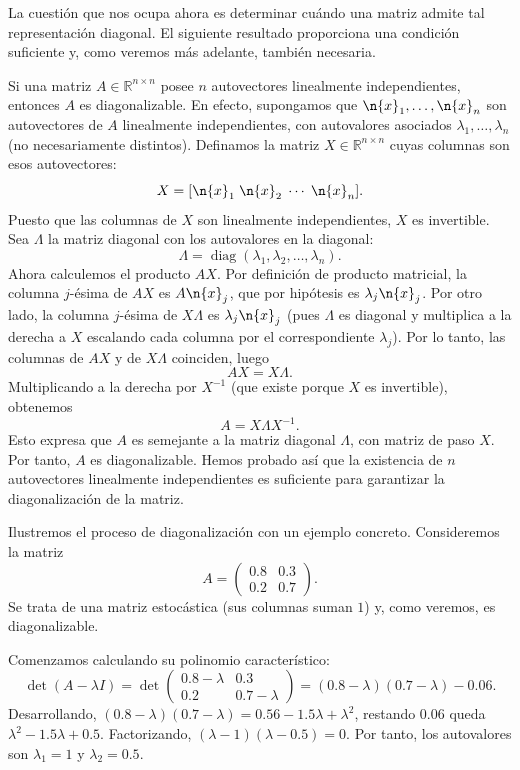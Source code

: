 La cuestión que nos ocupa ahora es determinar cuándo una matriz admite tal representación diagonal. El siguiente resultado proporciona una condición suficiente y, como veremos más adelante, también necesaria.

Si una matriz $A \in \mathbb{R}^{n\times n}$ posee $n$ autovectores linealmente independientes, entonces $A$ es diagonalizable. En efecto, supongamos que $\n{x}_1, \dots, \n{x}_n$ son autovectores de $A$ linealmente independientes, con autovalores asociados $\lambda_1, \dots, \lambda_n$ (no necesariamente distintos). Definamos la matriz $X \in \mathbb{R}^{n\times n}$ cuyas columnas son esos autovectores:
\[
X = [\n{x}_1 \; \n{x}_2 \; \cdots \; \n{x}_n].
\]
Puesto que las columnas de $X$ son linealmente independientes, $X$ es invertible. Sea $\Lambda$ la matriz diagonal con los autovalores en la diagonal:
\[
\Lambda = \operatorname{diag}(\lambda_1, \lambda_2, \dots, \lambda_n).
\]
Ahora calculemos el producto $A X$. Por definición de producto matricial, la columna $j$-ésima de $A X$ es $A \n{x}_j$, que por hipótesis es $\lambda_j \n{x}_j$. Por otro lado, la columna $j$-ésima de $X \Lambda$ es $\lambda_j \n{x}_j$ (pues $\Lambda$ es diagonal y multiplica a la derecha a $X$ escalando cada columna por el correspondiente $\lambda_j$). Por lo tanto, las columnas de $A X$ y de $X \Lambda$ coinciden, luego
\[
A X = X \Lambda.
\]
Multiplicando a la derecha por $X^{-1}$ (que existe porque $X$ es invertible), obtenemos
\[
A = X \Lambda X^{-1}.
\]
Esto expresa que $A$ es semejante a la matriz diagonal $\Lambda$, con matriz de paso $X$. Por tanto, $A$ es diagonalizable. Hemos probado así que la existencia de $n$ autovectores linealmente independientes es suficiente para garantizar la diagonalización de la matriz.

Ilustremos el proceso de diagonalización con un ejemplo concreto. Consideremos la matriz
\[
A = \begin{pmatrix} 0.8 & 0.3 \\ 0.2 & 0.7 \end{pmatrix}.
\]
Se trata de una matriz estocástica (sus columnas suman \(1\)) y, como veremos, es diagonalizable.

Comenzamos calculando su polinomio característico:
\[
\det(A - \lambda I) = \det\begin{pmatrix} 0.8-\lambda & 0.3 \\ 0.2 & 0.7-\lambda \end{pmatrix}
= (0.8-\lambda)(0.7-\lambda) - 0.06.
\]
Desarrollando, \((0.8-\lambda)(0.7-\lambda) = 0.56 - 1.5\lambda + \lambda^2\), restando \(0.06\) queda \(\lambda^2 - 1.5\lambda + 0.5\). Factorizando, \((\lambda - 1)(\lambda - 0.5) = 0\). Por tanto, los autovalores son \(\lambda_1 = 1\) y \(\lambda_2 = 0.5\).

